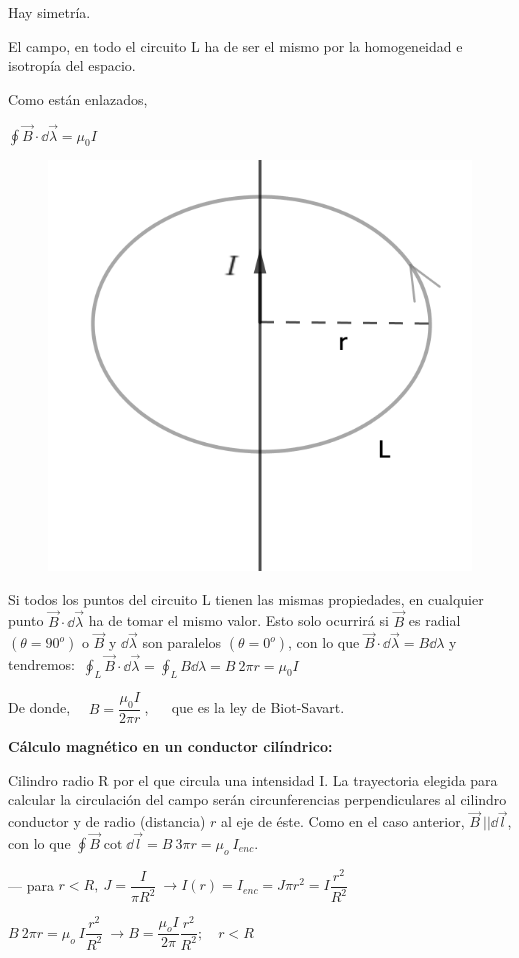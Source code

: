 \begin{multicols}{2}
Hay simetría.

El campo, en todo el circuito L ha de ser el mismo por la homogeneidad e isotropía del espacio.

Como están enlazados,

$ \displaystyle \oint \vec B \cdot \dd \vec \lambda = \mu_0 I$
\begin{figure}[H]
	\centering
	\includegraphics[width=.35\textwidth]{imagenes/imagenes27/T27IM05.png}
\end{figure}	
\end{multicols}

Si todos los puntos del circuito L tienen las mismas propiedades, en cualquier punto $\vec B \cdot \dd \vec \lambda$ ha de tomar el mismo valor. Esto solo ocurrirá si $\vec B$ es radial $(\theta=90^o)$ o $\vec B$ y $\dd \vec \lambda$ son paralelos $(\theta=0^o)$, con lo que 
	 $\vec B \cdot \dd \vec \lambda=B\dd \lambda$ y tendremos:
$\  \displaystyle \oint_L \vec B \cdot \dd \vec \lambda= \oint_L B \dd \lambda = B \ 2\pi r=\mu_0 I$

De donde, $\quad B=\dfrac{\mu_0 I}{2\pi r}\ $, $\quad$ que es la ley de Biot-Savart.

\textbf{Cálculo magnético en un conductor cilíndrico:}

Cilindro radio R por el que circula una intensidad I. La trayectoria elegida para calcular la circulación del campo serán circunferencias perpendiculares al cilindro conductor y de radio (distancia) $r$ al eje de éste. Como en el caso anterior, $\vec B \ || \dd \vec l$, con lo que $\oint \vec B \cot \dd \vec l=B\ 3\pi r = \mu_o \ I_{enc}$.

\vspace{5mm} %
--- para $r<R,\ J=\dfrac I {\pi R^2 } \ \to I(r)=I_{enc}=J \pi r^2=I\dfrac{r^2}{R^2}$

$B\ 2\pi r=\mu_o \ I\dfrac{r^2}{R^2} \ \to B=\dfrac {\mu_o I}{2\pi} \dfrac{r^2}{R^2};\quad r<R$

